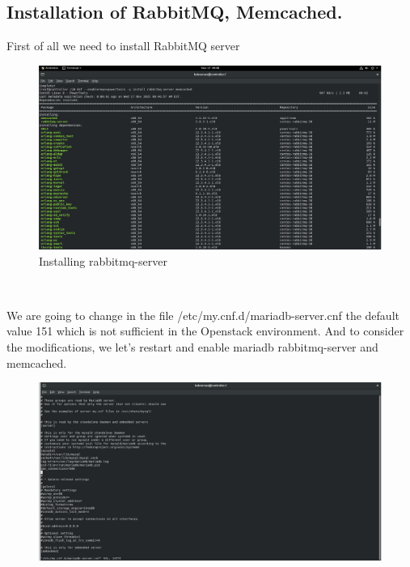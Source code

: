 \begin{spacing}{1.2}
\section{Installation of RabbitMQ, Memcached.}

\par First of all we need to install RabbitMQ server
\\
\begin{figure}[!htb] 
\begin{center} 
\includegraphics[width=1\linewidth]{Cloud/Pre-Requirements/Installing rabbitmq-server} 
\end{center} 
\caption{Installing rabbitmq-server} 
\end{figure}  \FloatBarrier
\\
\par We are going to change in the file /etc/my.cnf.d/mariadb-server.cnf the default value 151
which is not sufficient in the Openstack environment. And to consider the modifications, we
let's restart and enable mariadb rabbitmq-server and memcached. 
\\
\begin{figure}[!htb] 
\begin{center} 
\includegraphics[width=1\linewidth]{Cloud/Pre-Requirements/changing max_connections} 

\end{center}
\end{figure}
\end{spacing}
